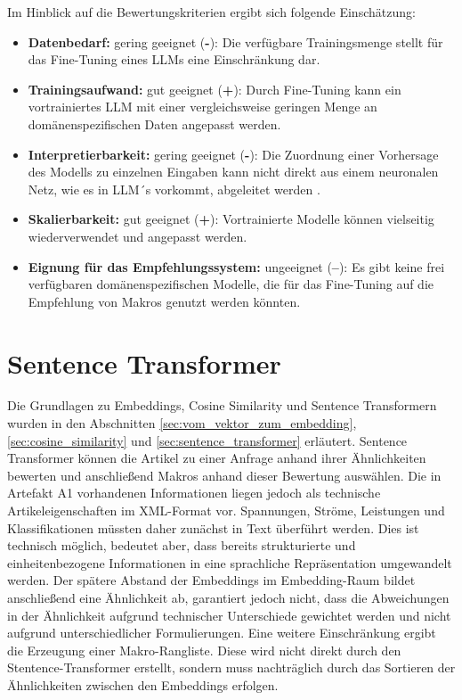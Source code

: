 Im Hinblick auf die Bewertungskriterien ergibt sich folgende Einschätzung:

\begin{itemize} 
    \item \textbf{Datenbedarf:} gering geeignet (\textbf{-}): Die verfügbare Trainingsmenge stellt für das Fine-Tuning eines LLMs eine Einschränkung dar. 
    \item \textbf{Trainingsaufwand:} gut geeignet (\textbf{+}): Durch Fine-Tuning kann ein vortrainiertes LLM mit einer vergleichsweise geringen Menge an domänenspezifischen Daten angepasst werden.
    \item \textbf{Interpretierbarkeit:} gering geeignet (\textbf{-}): Die Zuordnung einer Vorhersage des Modells zu einzelnen Eingaben kann nicht direkt aus einem neuronalen Netz, wie es in LLM´s vorkommt, abgeleitet werden \parencite{molnar2022interpretable}. 
    \item \textbf{Skalierbarkeit:} gut geeignet (\textbf{+}): Vortrainierte Modelle können vielseitig wiederverwendet und angepasst werden. 
    \item \textbf{Eignung für das Empfehlungssystem:} ungeeignet (\textbf{--}): Es gibt keine frei verfügbaren domänenspezifischen Modelle, die für das Fine-Tuning auf die Empfehlung von Makros genutzt werden könnten. 
\end{itemize} 

\section{Sentence Transformer} 
\label{sec:eignung_sentence_transformer} 

Die Grundlagen zu Embeddings, Cosine Similarity und Sentence Transformern wurden in den Abschnitten \ref{sec:vom_vektor_zum_embedding}, \ref{sec:cosine_similarity} und \ref{sec:sentence_transformer} erläutert. 
Sentence Transformer können die Artikel zu einer Anfrage anhand ihrer Ähnlichkeiten bewerten und anschließend Makros anhand dieser Bewertung auswählen. 
Die in Artefakt A1 vorhandenen Informationen liegen jedoch als technische Artikeleigenschaften im XML-Format vor. Spannungen, Ströme, Leistungen und Klassifikationen müssten daher zunächst in Text überführt werden. 
Dies ist technisch möglich, bedeutet aber, dass bereits strukturierte und einheitenbezogene Informationen in eine sprachliche Repräsentation umgewandelt werden. 
Der spätere Abstand der Embeddings im Embedding-Raum bildet anschließend eine Ähnlichkeit ab, garantiert jedoch nicht, dass die Abweichungen in der Ähnlichkeit aufgrund technischer Unterschiede gewichtet werden und nicht aufgrund unterschiedlicher Formulierungen.
Eine weitere Einschränkung ergibt die Erzeugung einer Makro-Rangliste. Diese wird nicht direkt durch den Stentence-Transformer erstellt, sondern muss nachträglich durch das Sortieren der Ähnlichkeiten zwischen den Embeddings erfolgen.

